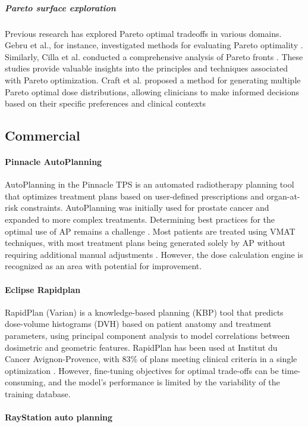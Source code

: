 \subparagraph{Pareto surface exploration}
Previous research has explored Pareto optimal tradeoffs in various domains.
Gebru et al., for instance, investigated methods for evaluating Pareto optimality \cite{Gebru2023}.
Similarly, Cilla et al. conducted a comprehensive analysis of Pareto fronts \cite{Cilla2018}.
These studies provide valuable insights into the principles and techniques associated with Pareto optimization.
Craft et al. proposed a method for generating multiple Pareto optimal dose distributions, allowing clinicians to make informed decisions based on their specific preferences and clinical contexts \cite{Craft2007}

\subsection{Commercial}
\paragraph{Pinnacle AutoPlanning}
AutoPlanning in the Pinnacle TPS is an automated radiotherapy planning tool that optimizes treatment plans based on user-defined prescriptions and organ-at-risk constraints.
AutoPlanning was initially used for prostate cancer and expanded to more complex treatments.
Determining best practices for the optimal use of AP remains a challenge \cite{Richter2019}.
Most patients are treated using VMAT techniques, with most treatment plans being generated solely by AP without requiring additional manual adjustments \cite{Meyer2021}.
However, the dose calculation engine is recognized as an area with potential for improvement.

\paragraph{Eclipse Rapidplan}
RapidPlan (Varian) is a knowledge-based planning (KBP) tool that predicts dose-volume histograms (DVH) based on patient anatomy and treatment parameters, using principal component analysis to model correlations between dosimetric and geometric features.
RapidPlan has been used at Institut du Cancer Avignon-Provence, with 83\% of plans meeting clinical criteria in a single optimization \cite{Meyer2021}.
However, fine-tuning objectives for optimal trade-offs can be time-consuming, and the model's performance is limited by the variability of the training database.

\paragraph{RayStation auto planning }
